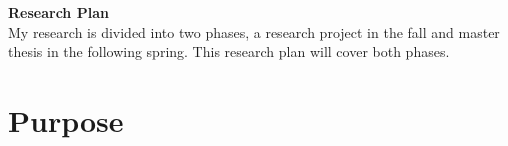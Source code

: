 
{\bf \Huge Research Plan} \\[0.5cm]

  My research is divided into two phases, a research project in the fall and master thesis in the following spring. This research plan will cover both phases.

  \section*{Purpose}

